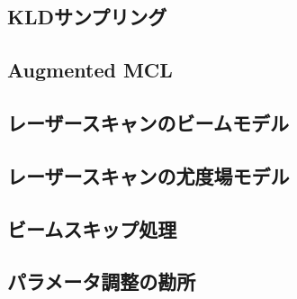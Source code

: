 \documentclass[{../../master}]{subfiles}
\begin{document}
\subsection{KLDサンプリング}

\subsection{Augmented MCL}

\subsection{レーザースキャンのビームモデル}

\subsection{レーザースキャンの尤度場モデル}

\subsection{ビームスキップ処理}

\subsection{パラメータ調整の勘所}
\end{document}
